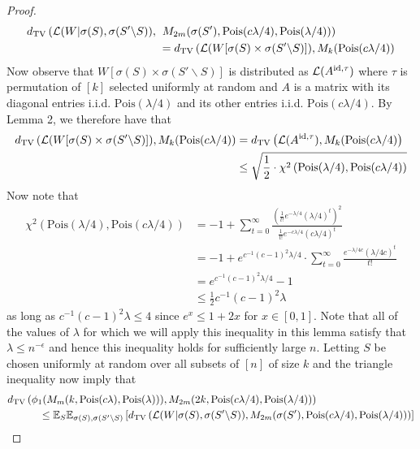 \documentclass[11pt]{article}
\begin{document}
\begin{proof}
\begin{align*}
d_{\text{TV}}\left( \mathcal{L}(W|\sigma(S), \sigma(S' \backslash S)), \right. &\left. M_{2m}(\sigma(S'), \text{Pois}(c\lambda/4), \text{Pois}(\lambda/4)) \right) \\
&= d_{\text{TV}}\left( \mathcal{L}(W[\sigma(S) \times \sigma(S' \backslash S)]), M_k(\text{Pois}(c\lambda/4) \right)
\end{align*}
Now observe that $W[\sigma(S) \times \sigma(S' \backslash S)]$ is distributed as $\mathcal{L}(A^{\text{id}, \tau})$ where $\tau$ is permutation of $[k]$ selected uniformly at random and $A$ is a matrix with its diagonal entries i.i.d. $\text{Pois}(\lambda/4)$ and its other entries i.i.d. $\text{Pois}(c\lambda/4)$. By Lemma 2, we therefore have that
\begin{align*}
d_{\text{TV}}\left( \mathcal{L}(W[\sigma(S) \times \sigma(S' \backslash S)]), M_k(\text{Pois}(c\lambda/4) \right) &= d_{\text{TV}}\left( \mathcal{L}(A^{\text{id}, \tau}), M_k(\text{Pois}(c\lambda/4) \right) \\
&\le \sqrt{\frac{1}{2} \cdot \chi^2\left( \text{Pois}(\lambda/4), \text{Pois}(c\lambda/4) \right)}
\end{align*}
Now note that
\begin{align*}
\chi^2\left( \text{Pois}(\lambda/4), \text{Pois}(c\lambda/4) \right) &= -1 + \sum_{t = 0}^\infty \frac{\left( \frac{1}{t!} e^{-\lambda/4} (\lambda/4)^t \right)^2}{\frac{1}{t!} e^{-c\lambda/4} (c\lambda/4)^t} \\
&= -1 + e^{c^{-1}(c-1)^2 \lambda/4} \cdot \sum_{t = 0}^\infty \frac{e^{-\lambda/4c} (\lambda/4c)^t}{t!} \\
&= e^{c^{-1}(c-1)^2 \lambda/4} - 1 \\
&\le \frac{1}{2} c^{-1}(c-1)^2 \lambda
\end{align*}
as long as $c^{-1}(c-1)^2 \lambda \le 4$ since $e^x \le 1 + 2x$ for $x \in [0, 1]$. Note that all of the values of $\lambda$ for which we will apply this inequality in this lemma satisfy that $\lambda \le n^{-\epsilon}$ and hence this inequality holds for sufficiently large $n$. Letting $S$ be chosen uniformly at random over all subsets of $[n]$ of size $k$ and the triangle inequality now imply that
\begin{align*}
&\TV\left( \phi_1(M_m(k, \text{Pois}(c\lambda), \text{Pois}(\lambda))), M_{2m}(2k, \text{Pois}(c\lambda/4), \text{Pois}(\lambda/4)) \right) \\
&\quad \quad \quad \le \bE_{S} \bE_{\sigma(S), \sigma(S'\backslash S)} \left[ \TV\left( \mL(W|\sigma(S), \sigma(S' \backslash S)), M_{2m}(\sigma(S'), \text{Pois}(c\lambda/4), \text{Pois}(\lambda/4)) \right) \right] \\

\end{align*}
\end{proof}
\end{document}

